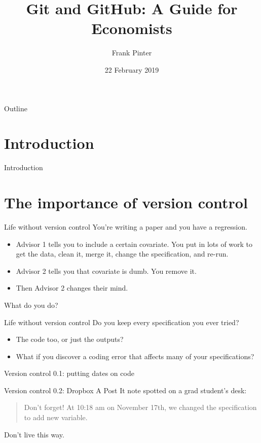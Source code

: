 \documentclass{beamer}
\title[Git for Economists]{Git and GitHub: A Guide for Economists}
\author{Frank Pinter}
\date{22 February 2019}
\begin{document}
\begin{frame}
  \titlepage
\end{frame}

\begin{frame}{Outline}
  \tableofcontents
\end{frame}

\section*{Introduction}

\begin{frame}{Introduction}
\end{frame}

\section{The importance of version control}

\begin{frame}{Life without version control}
You're writing a paper and you have a regression.
\begin{itemize}
\item Advisor 1 tells you to include a certain covariate. You put in lots of work to get the data, clean it, merge it, change the specification, and re-run.
\item Advisor 2 tells you that covariate is dumb. You remove it.
\item Then Advisor 2 changes their mind.
\end{itemize}
What do you do?
\end{frame}

\begin{frame}{Life without version control}
Do you keep every specification you ever tried?
\begin{itemize}
\item The code too, or just the outputs?
\item What if you discover a coding error that affects many of your specifications?
\end{itemize}
\end{frame}


\begin{frame}{Version control 0.1: putting dates on code}
\end{frame}

\begin{frame}{Version control 0.2: Dropbox}
A Post It note spotted on a grad student's desk:
\begin{quote}
	Don't forget! At 10:18 am on November 17th, we changed the specification to add new variable.
\end{quote}
Don't live this way.
\end{frame}
\end{document}
